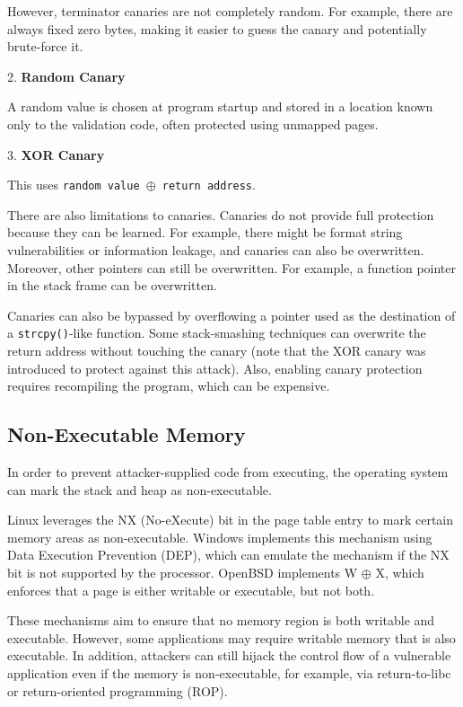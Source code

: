 However, terminator canaries are not completely random. For example, there are always fixed zero bytes, making it easier to guess the canary and potentially brute-force it.

2. \textbf{Random Canary}

A random value is chosen at program startup and stored in a location known only to the validation code, often protected using unmapped pages.

3. \textbf{XOR Canary}

This uses \texttt{random value \(\oplus\) return address}.

There are also limitations to canaries. Canaries do not provide full protection because they can be learned. For example, there might be format string vulnerabilities or information leakage, and canaries can also be overwritten. Moreover, other pointers can still be overwritten. For example, a function pointer in the stack frame can be overwritten.

Canaries can also be bypassed by overflowing a pointer used as the destination of a \texttt{strcpy()}-like function. Some stack-smashing techniques can overwrite the return address without touching the canary (note that the XOR canary was introduced to protect against this attack). Also, enabling canary protection requires recompiling the program, which can be expensive.

\subsection{Non-Executable Memory}

In order to prevent attacker-supplied code from executing, the operating system can mark the stack and heap as non-executable.

\begin{remark}
  Linux leverages the NX (No-eXecute) bit in the page table entry to mark certain memory areas as non-executable. Windows implements this mechanism using Data Execution Prevention (DEP), which can emulate the mechanism if the NX bit is not supported by the processor. OpenBSD implements W \(\oplus\) X, which enforces that a page is either writable or executable, but not both.
\end{remark}

These mechanisms aim to ensure that no memory region is both writable and executable. However, some applications may require writable memory that is also executable. In addition, attackers can still hijack the control flow of a vulnerable application even if the memory is non-executable, for example, via return-to-libc or return-oriented programming (ROP).

